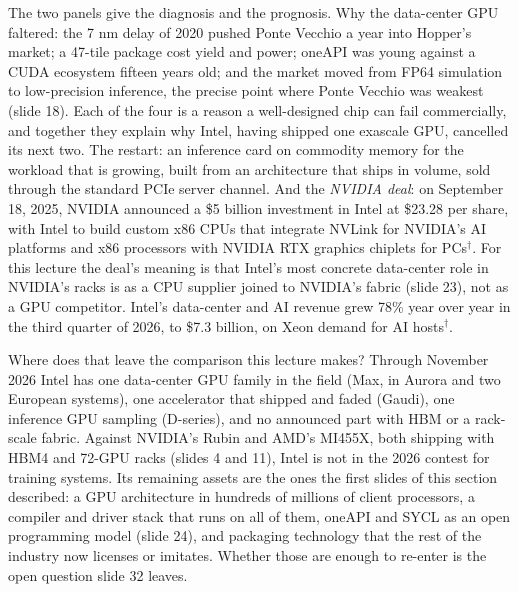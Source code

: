\documentclass[11pt,letterpaper]{article}
\begin{document}
The two panels give the diagnosis and the prognosis. Why the data-center GPU faltered: the 7 nm delay of 2020 pushed Ponte Vecchio a year into Hopper's market; a 47-tile package cost yield and power; oneAPI was young against a CUDA ecosystem fifteen years old; and the market moved from FP64 simulation to low-precision inference, the precise point where Ponte Vecchio was weakest (slide 18). Each of the four is a reason a well-designed chip can fail commercially, and together they explain why Intel, having shipped one exascale GPU, cancelled its next two. The restart: an inference card on commodity memory for the workload that is growing, built from an architecture that ships in volume, sold through the standard PCIe server channel. And the \emph{NVIDIA deal}: on September 18, 2025, NVIDIA announced a \$5 billion investment in Intel at \$23.28 per share, with Intel to build custom x86 CPUs that integrate NVLink for NVIDIA's AI platforms and x86 processors with NVIDIA RTX graphics chiplets for PCs$^\dagger$. For this lecture the deal's meaning is that Intel's most concrete data-center role in NVIDIA's racks is as a CPU supplier joined to NVIDIA's fabric (slide 23), not as a GPU competitor. Intel's data-center and AI revenue grew 78\% year over year in the third quarter of 2026, to \$7.3 billion, on Xeon demand for AI hosts$^\dagger$.

Where does that leave the comparison this lecture makes? Through November 2026 Intel has one data-center GPU family in the field (Max, in Aurora and two European systems), one accelerator that shipped and faded (Gaudi), one inference GPU sampling (D-series), and no announced part with HBM or a rack-scale fabric. Against NVIDIA's Rubin and AMD's MI455X, both shipping with HBM4 and 72-GPU racks (slides 4 and 11), Intel is not in the 2026 contest for training systems. Its remaining assets are the ones the first slides of this section described: a GPU architecture in hundreds of millions of client processors, a compiler and driver stack that runs on all of them, oneAPI and SYCL as an open programming model (slide 24), and packaging technology that the rest of the industry now licenses or imitates. Whether those are enough to re-enter is the open question slide 32 leaves.
\end{document}
